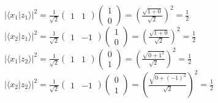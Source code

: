 \documentclass[12pt]{article}
\renewcommand{\>}{\rangle}
\newcommand{\<}{\langle}
\begin{document}
\noindent
$|\<x_1 | z_1 \>|^2 = \frac{1}{\sqrt 2} \left(\begin{array}{cc} 1 & 1 \end{array}\right)  \left(\begin{array}{cc} 1 \\ 0\end{array}\right) = \left( \frac{\sqrt{1 + 0}}{\sqrt 2}\right)^2 = \frac{1}{2} $ \\
$|\<x_2 | z_1 \>|^2 = \frac{1}{\sqrt 2} \left(\begin{array}{cc} 1 & -1 \end{array}\right)  \left(\begin{array}{cc} 1 \\ 0\end{array}\right) = \left( \frac{\sqrt{1 + 0}}{\sqrt 2}\right)^2 = \frac{1}{2} $ \\
$|\<x_1 | z_2 \>|^2 = \frac{1}{\sqrt 2} \left(\begin{array}{cc} 1 & 1\end{array}\right)  \left(\begin{array}{cc} 0 \\ 1\end{array}\right) = \left( \frac{\sqrt{0 + 1^2}}{\sqrt 2}\right)^2 = \frac{1}{2} $ \\
$|\<x_2 | z_2 \>|^2 = \frac{1}{\sqrt 2} \left(\begin{array}{cc} 1 & -1\end{array}\right)  \left(\begin{array}{cc} 0 \\ 1\end{array}\right) = \left( \frac{\sqrt{0 + (-1)^2}}{\sqrt 2}\right)^2  = \frac{1}{2} $ \newline \newline
\end{document}
